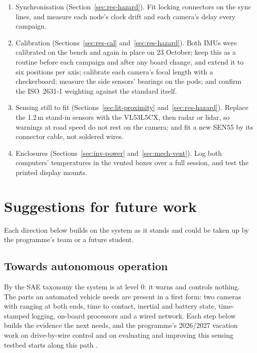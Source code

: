 \begin{enumerate}
\item Synchronisation (Section~\ref{sec:res-hazard}). Fit locking connectors on the sync lines, and measure each node's clock drift and each camera's delay every campaign.
\item Calibration (Sections~\ref{sec:res-cal} and~\ref{sec:res-hazard}). Both IMUs were calibrated on the bench and again in place on 23 October; keep this as a routine before each campaign and after any board change, and extend it to six positions per axis; calibrate each camera's focal length with a checkerboard; measure the side sensors' bearings on the pods; and confirm the ISO~2631-1 weighting against the standard itself.
\item Sensing still to fit (Sections~\ref{sec:lit-proximity} and~\ref{sec:res-hazard}). Replace the 1.2\,m stand-in sensors with the VL53L5CX, then radar or lidar, so warnings at road speed do not rest on the camera; and fit a new SEN55 by its connector cable, not soldered wires.
\item Enclosures (Sections~\ref{sec:inv-power} and~\ref{sec:mech-vent}). Log both computers' temperatures in the vented boxes over a full session, and test the printed display mounts.
\end{enumerate}

\section{Suggestions for future work}
\label{sec:recs-future}

Each direction below builds on the system as it stands and could be taken up by the programme's team or a future student.

\subsection{Towards autonomous operation}
\label{sec:recs-autonomy}

By the SAE taxonomy \cite{saej3016} the system is at level 0: it warns and controls nothing. The parts an automated vehicle needs are present in a first form: two cameras with ranging at both ends, time to contact, inertial and battery state, time-stamped logging, on-board processors and a wired network. Each step below builds the evidence the next needs, and the programme's 2026/2027 vacation work on drive-by-wire control and on evaluating and improving this sensing testbed starts along this path \cite{tukzie2026vac}.

